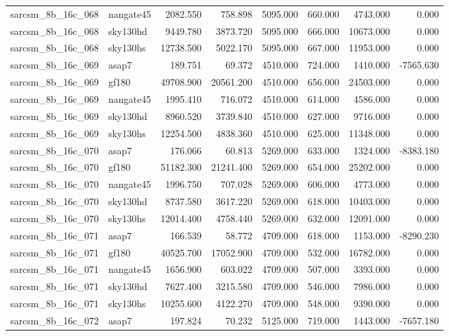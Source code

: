 \begin{tabular}{llrrrrrr}
sarcsm\_8b\_16c\_068 & nangate45 & 2082.550 & 758.898 & 5095.000 & 660.000 & 4743.000 & 0.000 \\
sarcsm\_8b\_16c\_068 & sky130hd & 9449.780 & 3873.720 & 5095.000 & 666.000 & 10673.000 & 0.000 \\
sarcsm\_8b\_16c\_068 & sky130hs & 12738.500 & 5022.170 & 5095.000 & 667.000 & 11953.000 & 0.000 \\
sarcsm\_8b\_16c\_069 & asap7 & 189.751 & 69.372 & 4510.000 & 724.000 & 1410.000 & -7565.630 \\
sarcsm\_8b\_16c\_069 & gf180 & 49708.900 & 20561.200 & 4510.000 & 656.000 & 24503.000 & 0.000 \\
sarcsm\_8b\_16c\_069 & nangate45 & 1995.410 & 716.072 & 4510.000 & 614.000 & 4586.000 & 0.000 \\
sarcsm\_8b\_16c\_069 & sky130hd & 8960.520 & 3739.840 & 4510.000 & 627.000 & 9716.000 & 0.000 \\
sarcsm\_8b\_16c\_069 & sky130hs & 12254.500 & 4838.360 & 4510.000 & 625.000 & 11348.000 & 0.000 \\
sarcsm\_8b\_16c\_070 & asap7 & 176.066 & 60.813 & 5269.000 & 633.000 & 1324.000 & -8383.180 \\
sarcsm\_8b\_16c\_070 & gf180 & 51182.300 & 21241.400 & 5269.000 & 654.000 & 25202.000 & 0.000 \\
sarcsm\_8b\_16c\_070 & nangate45 & 1996.750 & 707.028 & 5269.000 & 606.000 & 4773.000 & 0.000 \\
sarcsm\_8b\_16c\_070 & sky130hd & 8737.580 & 3617.220 & 5269.000 & 618.000 & 10403.000 & 0.000 \\
sarcsm\_8b\_16c\_070 & sky130hs & 12014.400 & 4758.440 & 5269.000 & 632.000 & 12091.000 & 0.000 \\
sarcsm\_8b\_16c\_071 & asap7 & 166.539 & 58.772 & 4709.000 & 618.000 & 1153.000 & -8290.230 \\
sarcsm\_8b\_16c\_071 & gf180 & 40525.700 & 17052.900 & 4709.000 & 532.000 & 16782.000 & 0.000 \\
sarcsm\_8b\_16c\_071 & nangate45 & 1656.900 & 603.022 & 4709.000 & 507.000 & 3393.000 & 0.000 \\
sarcsm\_8b\_16c\_071 & sky130hd & 7627.400 & 3215.580 & 4709.000 & 546.000 & 7986.000 & 0.000 \\
sarcsm\_8b\_16c\_071 & sky130hs & 10255.600 & 4122.270 & 4709.000 & 548.000 & 9390.000 & 0.000 \\
sarcsm\_8b\_16c\_072 & asap7 & 197.824 & 70.232 & 5125.000 & 719.000 & 1443.000 & -7657.180 \\

\end{tabular}
